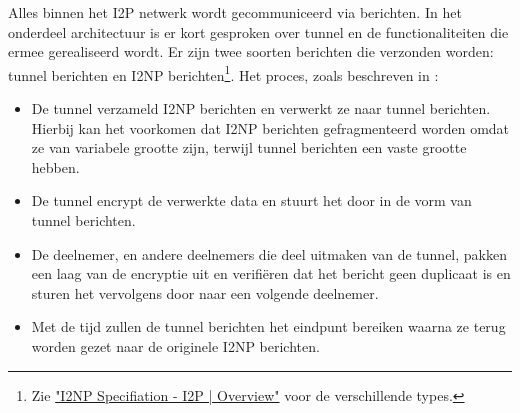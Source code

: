 Alles binnen het \acrshort{I2P} netwerk wordt gecommuniceerd via berichten. In het onderdeel architectuur is er kort gesproken over \Gls{tunnel} en de functionaliteiten die ermee gerealiseerd wordt. Er zijn twee soorten berichten die verzonden worden: \Gls{tunnel} berichten en \acrfull{I2NP} berichten\footnote{Zie \href{https://geti2p.net/en/docs/protocol/i2np}{"I2NP Specifiation - I2P | Overview"} voor de verschillende types.}. Het proces, zoals beschreven in \cite{moneropedia:message}:

\begin{itemize}
  \setlength\itemsep{-0.7em}
  \item De \Gls{tunnel} verzameld \acrshort{I2NP} berichten en verwerkt ze naar \Gls{tunnel} berichten. Hierbij kan het voorkomen dat \acrshort{I2NP} berichten gefragmenteerd worden omdat ze van variabele grootte zijn, terwijl \Gls{tunnel} berichten een vaste grootte hebben.
  \item De \Gls{tunnel} encrypt de verwerkte data en stuurt het door in de vorm van \Gls{tunnel} berichten.
  \item De deelnemer, en andere deelnemers die deel uitmaken van de \Gls{tunnel}, pakken een laag van de encryptie uit en verifiëren dat het bericht geen duplicaat is en sturen het vervolgens door naar een volgende deelnemer.
  \item Met de tijd zullen de \Gls{tunnel} berichten het eindpunt bereiken waarna ze terug worden gezet naar de originele \acrshort{I2NP} berichten.
\end{itemize}